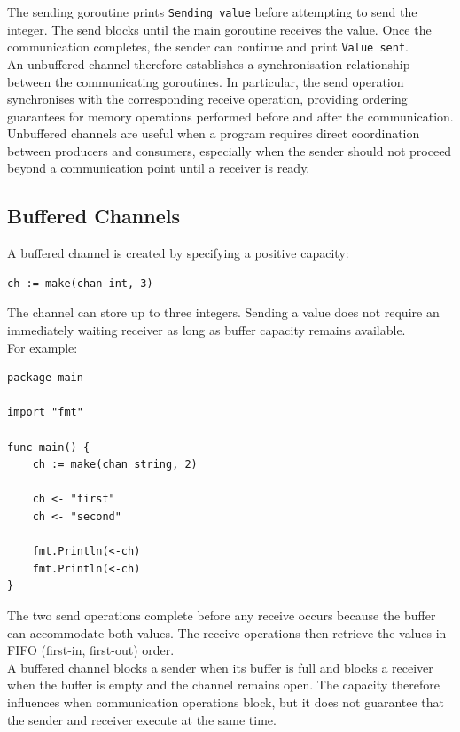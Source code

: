 The sending goroutine prints \texttt{Sending value} before attempting to send the integer. The send blocks until the main goroutine receives the value. Once the communication completes, the sender can continue and print \texttt{Value sent}.\\

An unbuffered channel therefore establishes a synchronisation relationship between the communicating goroutines. In particular, the send operation synchronises with the corresponding receive operation, providing ordering guarantees for memory operations performed before and after the communication.\\

Unbuffered channels are useful when a program requires direct coordination between producers and consumers, especially when the sender should not proceed beyond a communication point until a receiver is ready.

\subsection{Buffered Channels}

A buffered channel is created by specifying a positive capacity:

\begin{lstlisting}
ch := make(chan int, 3)
\end{lstlisting}

The channel can store up to three integers. Sending a value does not require an immediately waiting receiver as long as buffer capacity remains available.\\

For example:

\begin{lstlisting}
package main

import "fmt"

func main() {
    ch := make(chan string, 2)

    ch <- "first"
    ch <- "second"

    fmt.Println(<-ch)
    fmt.Println(<-ch)
}
\end{lstlisting}

The two send operations complete before any receive occurs because the buffer can accommodate both values. The receive operations then retrieve the values in FIFO (first-in, first-out) order.\\

A buffered channel blocks a sender when its buffer is full and blocks a receiver when the buffer is empty and the channel remains open. The capacity therefore influences when communication operations block, but it does not guarantee that the sender and receiver execute at the same time.\\

